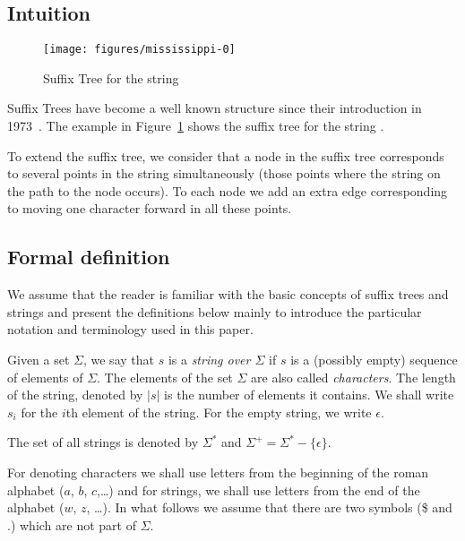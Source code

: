 \subsection{Intuition}

\begin{figure}
\centering
\texttt{[image: figures/mississippi-0]}
\caption{Suffix Tree for the string }%
\label{fig:mississippi-0}
\end{figure}

Suffix Trees have become a well known structure since their introduction in 1973~\cite{DBLP:conf/focs/Weiner73}. The example in Figure~\ref{fig:mississippi-0} shows the suffix tree for the string .

To extend the suffix tree, we consider that a node in the suffix tree corresponds to several points in the string simultaneously (those points where the string on the path to the node occurs). To each node we add an extra edge corresponding to moving one character forward in all these points.

\subsection{Formal definition}

We assume that the reader is familiar with the basic concepts of suffix trees and strings and present the definitions below mainly to introduce the particular notation and terminology used in this paper.

\begin{definition}
Given a set $\Sigma$, we say that $s$ is a \emph{string over $\Sigma$} if $s$ is a (possibly empty) sequence of elements of $\Sigma$. The elements of the set $\Sigma$ are also called \emph{characters}. The length of the string, denoted by $|s|$ is the number of elements it contains. We shall write $s_i$ for the $i$th element of the string. For the empty string, we write $\epsilon$.

The set of all strings is denoted by $\Sigma^*$ and $\Sigma^+=\Sigma^*-\{\epsilon\}$.
\end{definition}

For denoting characters we shall use letters from the beginning of the roman alphabet ($a$, $b$, $c$,\ldots) and for strings, we shall use letters from the end of the alphabet ($w$, $z$, \ldots). In what follows we assume that there are two symbols (\$ and $.$) which are not part of $\Sigma$.

